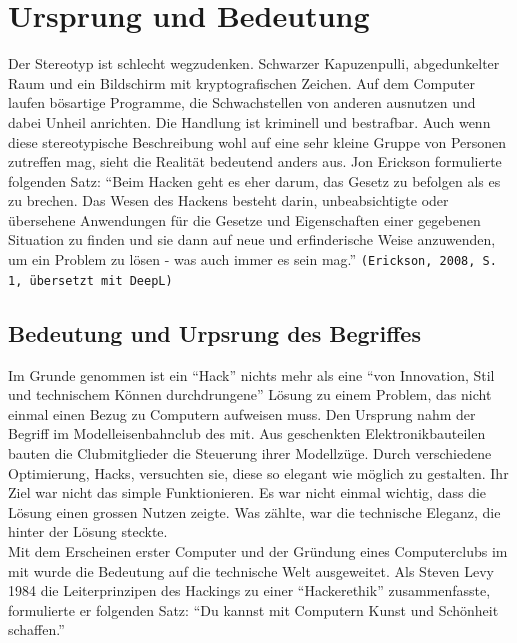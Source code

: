 \documentclass[11pt, a4paper]{article}
\begin{document}
\newpage
\section{Ursprung und Bedeutung}
Der Stereotyp ist schlecht wegzudenken. Schwarzer Kapuzenpulli, abgedunkelter Raum und ein Bildschirm mit kryptografischen Zeichen. Auf dem Computer laufen bösartige Programme, die Schwachstellen von anderen ausnutzen und dabei Unheil anrichten. Die Handlung ist kriminell und bestrafbar. Auch wenn diese stereotypische Beschreibung wohl auf eine sehr kleine Gruppe von Personen zutreffen mag, sieht die Realität bedeutend anders aus. Jon Erickson formulierte folgenden Satz: ``Beim Hacken geht es eher darum, das Gesetz zu befolgen als es zu brechen. Das Wesen des Hackens besteht darin, unbeabsichtigte oder übersehene Anwendungen für die Gesetze und Eigenschaften einer gegebenen Situation zu finden und sie dann auf neue und erfinderische Weise anzuwenden, um ein Problem zu lösen - was auch immer es sein mag.'' \texttt{(Erickson, 2008, S. 1, übersetzt mit DeepL)} \cite{erickson2008hacking}



\subsection{Bedeutung und Urpsrung des Begriffes}
Im Grunde genommen ist ein ``Hack'' nichts mehr als eine ``von Innovation, Stil und technischem Können durchdrungene'' Lösung zu einem Problem, das nicht einmal einen Bezug zu Computern aufweisen muss. Den Ursprung nahm der Begriff im Modelleisenbahnclub des \gls{mit}. Aus geschenkten Elektronikbauteilen bauten die Clubmitglieder die Steuerung ihrer Modellzüge. Durch verschiedene Optimierung, Hacks, versuchten sie, diese so elegant wie möglich zu gestalten. Ihr Ziel war nicht das simple Funktionieren. Es war nicht einmal wichtig, dass die Lösung einen grossen Nutzen zeigte. Was zählte, war die technische Eleganz, die hinter der Lösung steckte. \\Mit dem Erscheinen erster Computer und der Gründung eines Computerclubs im \gls{mit} wurde die Bedeutung auf die technische Welt ausgeweitet. Als Steven Levy 1984 die Leiterprinzipen des Hackings zu einer ``Hackerethik'' zusammenfasste, formulierte er folgenden Satz: ``Du kannst mit Computern Kunst und Schönheit schaffen.'' \cite{bpbKleineGeschichte:online}
\end{document}
